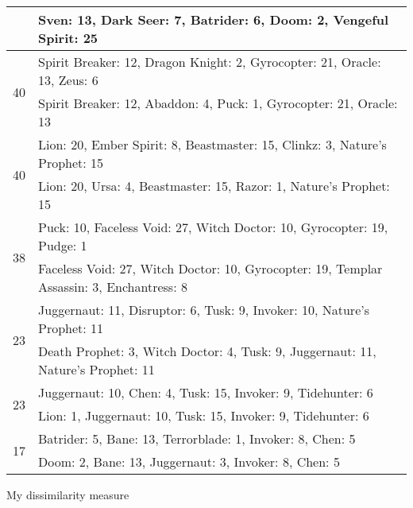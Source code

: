 \begin{table}[H]
\begin{tabular}{ | c | p{12.5cm} | }
& Sven: 13, Dark Seer: 7, Batrider: 6, Doom: 2, Vengeful Spirit: 25 \\
\hline
\multirow{2}{*}{40}
& Spirit Breaker: 12, Dragon Knight: 2, Gyrocopter: 21, Oracle: 13, Zeus: 6 \\
& Spirit Breaker: 12, Abaddon: 4, Puck: 1, Gyrocopter: 21, Oracle: 13 \\
\hline
\multirow{2}{*}{40}
& Lion: 20, Ember Spirit: 8, Beastmaster: 15, Clinkz: 3, Nature's Prophet: 15 \\
& Lion: 20, Ursa: 4, Beastmaster: 15, Razor: 1, Nature's Prophet: 15 \\
\hline
\multirow{2}{*}{38}
& Puck: 10, Faceless Void: 27, Witch Doctor: 10, Gyrocopter: 19, Pudge: 1 \\
& Faceless Void: 27, Witch Doctor: 10, Gyrocopter: 19, Templar Assassin: 3, Enchantress: 8 \\
\hline
\multirow{2}{*}{23}
& Juggernaut: 11, Disruptor: 6, Tusk: 9, Invoker: 10, Nature's Prophet: 11 \\
& Death Prophet: 3, Witch Doctor: 4, Tusk: 9, Juggernaut: 11, Nature's Prophet: 11 \\
\hline
\multirow{2}{*}{23}
& Juggernaut: 10, Chen: 4, Tusk: 15, Invoker: 9, Tidehunter: 6 \\
& Lion: 1, Juggernaut: 10, Tusk: 15, Invoker: 9, Tidehunter: 6 \\
\hline
\multirow{2}{*}{17}
& Batrider: 5, Bane: 13, Terrorblade: 1, Invoker: 8, Chen: 5 \\
& Doom: 2, Bane: 13, Juggernaut: 3, Invoker: 8, Chen: 5 \\
\hline
    \end{tabular}
    \caption{}
    \label{}
    \end{table}

My dissimilarity measure

